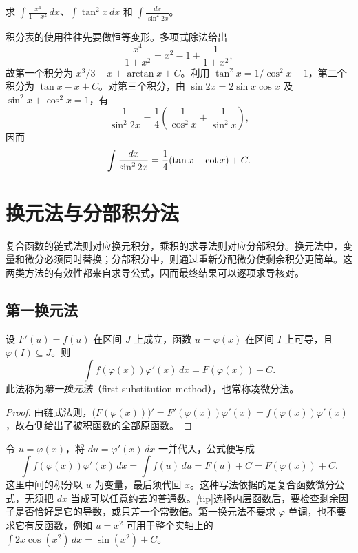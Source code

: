 \documentclass[UTF8,12pt,a4paper,fontset=fandol]{ctexbook}
\begin{document}
\begin{example}
\label{ex:basic-indefinite-integral-transformations}
求 $\displaystyle\int\frac{x^4}{1+x^2}\,dx$、$\displaystyle\int\tan^2x\,dx$ 和 $\displaystyle\int\frac{dx}{\sin^2 2x}$。
\end{example}

\begin{solve}
积分表的使用往往先要做恒等变形。多项式除法给出
\[
    \frac{x^4}{1+x^2}=x^2-1+\frac1{1+x^2},
\]
故第一个积分为 $x^3/3-x+\arctan x+C$。利用 $\tan^2x=1/\cos^2x-1$，第二个积分为 $\tan x-x+C$。对第三个积分，由 $\sin2x=2\sin x\cos x$ 及 $\sin^2x+\cos^2x=1$，有
\[
    \frac1{\sin^2 2x}=\frac14\left(\frac1{\cos^2x}+\frac1{\sin^2x}\right),
\]
因而
\[
    \int\frac{dx}{\sin^2 2x}=\frac14(\tan x-\cot x)+C.
    \qedhere
\]
\end{solve}

\section{换元法与分部积分法}
\label{sec:substitution-and-integration-by-parts}

复合函数的链式法则对应换元积分，乘积的求导法则对应分部积分。换元法中，变量和微分必须同时替换；分部积分中，则通过重新分配微分使剩余积分更简单。这两类方法的有效性都来自求导公式，因而最终结果可以逐项求导核对。

\subsection{第一换元法}
\label{subsec:first-substitution-method}

\begin{theorem}[第一换元积分法]
\label{thm:first-substitution-indefinite-integral}
设 $F'(u)=f(u)$ 在区间 $J$ 上成立，函数 $u=\varphi(x)$ 在区间 $I$ 上可导，且 $\varphi(I)\subseteq J$。则
\begin{equation}
    \int f(\varphi(x))\varphi'(x)\,dx
       =F(\varphi(x))+C.
    \label{eq:first-substitution-indefinite-integral}
\end{equation}
此法称为\emph{第一换元法}（first substitution method），也常称凑微分法。
\end{theorem}

\begin{proof}
由链式法则，$\bigl(F(\varphi(x))\bigr)'=F'(\varphi(x))\varphi'(x)=f(\varphi(x))\varphi'(x)$，故右侧给出了被积函数的全部原函数。
\end{proof}

令 $u=\varphi(x)$，将 $du=\varphi'(x)\,dx$ 一并代入，公式便写成
\[
    \int f(\varphi(x))\varphi'(x)\,dx
       =\int f(u)\,du=F(u)+C=F(\varphi(x))+C.
\]
这里中间的积分以 $u$ 为变量，最后须代回 $x$。这种写法依据的是复合函数微分公式，无须把 $dx$ 当成可以任意约去的普通数。\emph[tip]{选择内层函数后，要检查剩余因子是否恰好是它的导数，或只差一个常数倍。}第一换元法不要求 $\varphi$ 单调，也不要求它有反函数，例如 $u=x^2$ 可用于整个实轴上的 $\int 2x\cos(x^2)\,dx=\sin(x^2)+C$。
\end{document}
